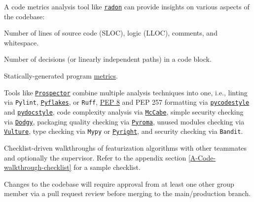 \documentclass[12pt, titlepage]{article}
\begin{document}
\begin{description}[style=unboxed,leftmargin=0cm]
  \item[Code Metrics Analysis] A code metrics analysis tool like \href{https://radon.readthedocs.io/en/stable/index.html}{\texttt{radon}} can provide insights on various aspects of the codebase:
    \begin{description}[style=unboxed,labelindent=1cm]
      \item[Raw metrics] Number of lines of source code (SLOC), logic (LLOC), comments, and whitespace.
      \item[Cyclomatic complexity] Number of decisions (or linearly independent paths) in a code block.
      \item[Halstead metrics] Statically-generated program \href{https://radon.readthedocs.io/en/stable/intro.html#halstead-metrics}{metrics}.
    \end{description}
  
  \item[Composite Analysis Techniques] Tools like \href{https://radon.readthedocs.io/en/stable/index.html}{\texttt{Prospector}} combine multiple analysis techniques into one, i.e., linting via \texttt{Pylint}, \href{https://launchpad.net/pyflakes}{\texttt{Pyflakes}}, or \texttt{Ruff}, \href{https://peps.python.org/pep-8}{PEP 8} and PEP 257 formatting via \href{https://pycodestyle.pycqa.org/en/stable/}{\texttt{pycodestyle}} and \href{https://www.pydocstyle.org/en/stable/}{\texttt{pydocstyle}}, code complexity analysis via \href{https://flake8.pycqa.org/en/stable/}{\texttt{McCabe}}, simple security checking via \href{https://github.com/prospector-dev/dodgy}{\texttt{Dodgy}}, packaging quality checking via \href{https://github.com/regebro/pyroma}{\texttt{Pyroma}}, unused modules checking via \href{https://github.com/jendrikseipp/vulture}{\texttt{Vulture}}, type checking via \texttt{Mypy} or \href{https://microsoft.github.io/pyright/}{\texttt{Pyright}}, and security checking via \texttt{Bandit}.
  
  \item[Code Walkthroughs] Checklist-driven walkthroughs of featurization algorithms with other teammates and optionally the supervisor. Refer to the appendix section \ref{A-Code-walkthrough-checklist} for a sample checklist.
  
  \item[Peer Desk Checks] Changes to the codebase will require approval from at least one other group member via a pull request review before merging to the main/production branch.
\end{description}
\end{document}
